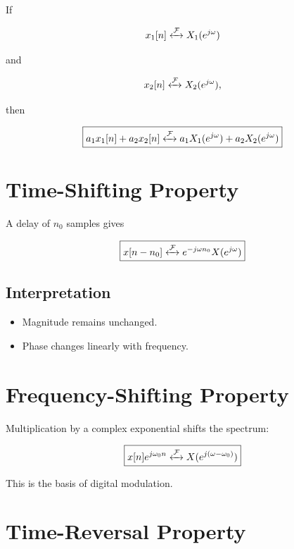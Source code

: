 If

\[
x_1[n]\xleftrightarrow{\mathcal{F}}X_1(e^{j\omega})
\]

and

\[
x_2[n]\xleftrightarrow{\mathcal{F}}X_2(e^{j\omega}),
\]

then

\[
\boxed{
a_1x_1[n]+a_2x_2[n]
\xleftrightarrow{\mathcal{F}}
a_1X_1(e^{j\omega})+a_2X_2(e^{j\omega})
}
\]


\section{Time-Shifting Property}

A delay of \(n_0\) samples gives

\[
\boxed{
x[n-n_0]
\xleftrightarrow{\mathcal{F}}
e^{-j\omega n_0}X(e^{j\omega})
}
\]


\subsection{Interpretation}

\begin{itemize}
\item Magnitude remains unchanged.
\item Phase changes linearly with frequency.
\end{itemize}


\section{Frequency-Shifting Property}

Multiplication by a complex exponential shifts the spectrum:

\[
\boxed{
x[n]e^{j\omega_0 n}
\xleftrightarrow{\mathcal{F}}
X(e^{j(\omega-\omega_0)})
}
\]

This is the basis of digital modulation.


\section{Time-Reversal Property}


